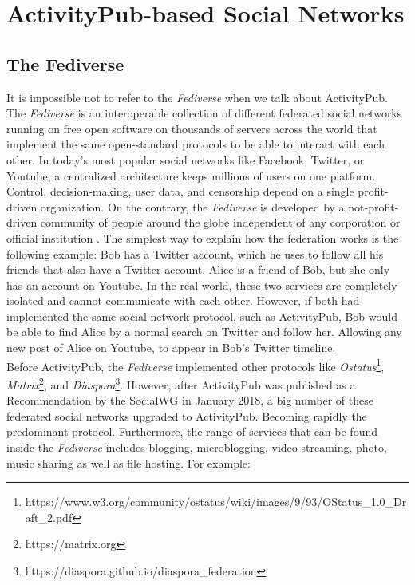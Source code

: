 \section{ActivityPub-based Social Networks}

\subsection{The Fediverse}

It is impossible not to refer to the \emph{Fediverse} when we talk about ActivityPub. The \emph{Fediverse} is an interoperable collection of different federated social networks running on free open software on thousands of servers across the world that implement the same open-standard protocols to be able to interact with each other. In today's most popular social networks like Facebook, Twitter, or Youtube, a centralized architecture keeps millions of users on one platform. Control, decision-making, user data, and censorship depend on a single profit-driven organization. On the contrary, the \emph{Fediverse} is developed by a not-profit-driven community of people around the globe independent of any corporation or official institution \cite{holloway_2018} \cite{https://doi.org/10.48550/arxiv.1909.05801}. The simplest way to explain how the federation works is the following example: Bob has a Twitter account, which he uses to follow all his friends that also have a Twitter account. Alice is a friend of Bob, but she only has an account on Youtube. In the real world, these two services are completely isolated and cannot communicate with each other. However, if both had implemented the same social network protocol, such as ActivityPub, Bob would be able to find Alice by a normal search on Twitter and follow her. Allowing any new post of Alice on Youtube, to appear in Bob's Twitter timeline. \\
Before ActivityPub, the \emph{Fediverse} implemented other protocols like \emph{Ostatus}\footnote{https://www.w3.org/community/ostatus/wiki/images/9/93/OStatus\_1.0\_Draft\_2.pdf}, \emph{Matrix}\footnote{https://matrix.org}, and \emph{Diaspora}\footnote{https://diaspora.github.io/diaspora\_federation}. However, after ActivityPub was published as a Recommendation by the SocialWG in January 2018, a big number of these federated social networks upgraded to ActivityPub. Becoming rapidly the predominant protocol. Furthermore, the range of services that can be found inside the \emph{Fediverse} includes blogging, microblogging, video streaming, photo, music sharing as well as file hosting. For example: 

